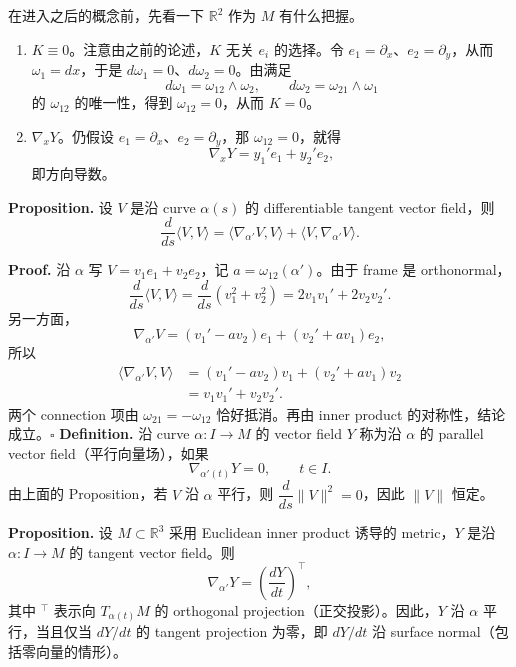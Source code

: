 \documentclass[UTF8,11pt,a4paper]{ctexart}
\begin{document}
\medskip
在进入之后的概念前，先看一下 $\mathbb{R}^2$ 作为 $M$ 有什么把握。
\begin{enumerate}
\item $K\equiv0$。注意由之前的论述，$K$ 无关 $e_i$ 的选择。令 $e_1=\partial_x$、$e_2=\partial_y$，从而 $\omega_1=dx$，于是 $d\omega_1=0$、$d\omega_2=0$。由满足
\[
d\omega_1=\omega_{12}\wedge\omega_2,
\qquad d\omega_2=\omega_{21}\wedge\omega_1
\]
的 $\omega_{12}$ 的唯一性，得到 $\omega_{12}=0$，从而 $K=0$。

\item $\nabla_xY$。仍假设 $e_1=\partial_x$、$e_2=\partial_y$，那 $\omega_{12}=0$，就得
\[
\nabla_xY=y_1'e_1+y_2'e_2,
\]
即方向导数。
\end{enumerate}

\medskip
\textbf{Proposition.} 设 $V$ 是沿 curve $\alpha(s)$ 的 differentiable tangent vector field，则
\[
\frac{d}{ds}\langle V,V\rangle
=\langle\nabla_{\alpha'}V,V\rangle
+\langle V,\nabla_{\alpha'}V\rangle.
\]

\textbf{Proof.} 沿 $\alpha$ 写 $V=v_1e_1+v_2e_2$，记 $a=\omega_{12}(\alpha')$。由于 frame 是 orthonormal，
\[
\frac{d}{ds}\langle V,V\rangle
=\frac{d}{ds}(v_1^2+v_2^2)
=2v_1v_1'+2v_2v_2'.
\]
另一方面，
\[
\nabla_{\alpha'}V=(v_1'-av_2)e_1+(v_2'+av_1)e_2,
\]
所以
\begin{align*}
\langle\nabla_{\alpha'}V,V\rangle
&=(v_1'-av_2)v_1+(v_2'+av_1)v_2\\
&=v_1v_1'+v_2v_2'.
\end{align*}
两个 connection 项由 $\omega_{21}=-\omega_{12}$ 恰好抵消。再由 inner product 的对称性，结论成立。\hfill$\square$
\textbf{Definition.} 沿 curve $\alpha\colon I\to M$ 的 vector field $Y$ 称为沿 $\alpha$ 的 parallel vector field（平行向量场），如果
\[
\nabla_{\alpha'(t)}Y=0,\qquad t\in I.
\]
由上面的 Proposition，若 $V$ 沿 $\alpha$ 平行，则 $\dfrac{d}{ds}\|V\|^2=0$，因此 $\|V\|$ 恒定。


\textbf{Proposition.} 设 $M\subset\mathbb{R}^3$ 采用 Euclidean inner product 诱导的 metric，$Y$ 是沿 $\alpha\colon I\to M$ 的 tangent vector field。则
\[
\nabla_{\alpha'}Y=\left(\frac{dY}{dt}\right)^{\top},
\]
其中 ${}^{\top}$ 表示向 $T_{\alpha(t)}M$ 的 orthogonal projection（正交投影）。因此，$Y$ 沿 $\alpha$ 平行，当且仅当 $dY/dt$ 的 tangent projection 为零，即 $dY/dt$ 沿 surface normal（包括零向量的情形）。
\end{document}
